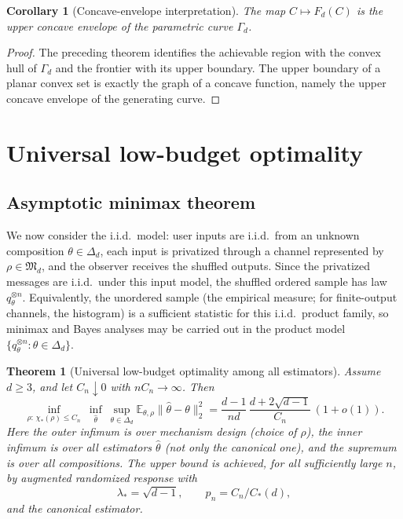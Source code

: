 \documentclass[11pt]{amsart}
\newtheorem{theorem}{Theorem}[section]
\newtheorem{corollary}[corollary]{Corollary}
\theoremstyle{definition}
\newcommand{\E}{\mathbb E}
\newcommand{\fM}{\mathfrak M}
\begin{document}
\begin{corollary}[Concave-envelope interpretation]\label{cor:concave-envelope}
The map $C\mapsto F_d(C)$ is the upper concave envelope of the parametric curve $\Gamma_d$.
\end{corollary}

\begin{proof}
The preceding theorem identifies the achievable region with the convex hull of $\Gamma_d$ and the frontier with its upper boundary. The upper boundary of a planar convex set is exactly the graph of a concave function, namely the upper concave envelope of the generating curve.
\end{proof}

\section{Universal low-budget optimality}\label{sec:asymptotic}

\subsection{Asymptotic minimax theorem}

We now consider the i.i.d.\ model: user inputs are i.i.d.\ from an unknown composition $\theta\in\Delta_d$, each input is privatized through a channel represented by $\rho\in\fM_d$, and the observer receives the shuffled outputs. Since the privatized messages are i.i.d.\ under this input model, the shuffled ordered sample has law $q_\theta^{\otimes n}$. Equivalently, the unordered sample (the empirical measure; for finite-output channels, the histogram) is a sufficient statistic for this i.i.d.\ product family, so minimax and Bayes analyses may be carried out in the product model $\{q_\theta^{\otimes n}:\theta\in\Delta_d\}$.

\begin{theorem}[Universal low-budget optimality among all estimators]\label{thm:main-design}
Assume $d\ge 3$, and let $C_n\downarrow 0$ with $nC_n\to\infty$. Then
\[
\inf_{\rho:\,\chi_*(\rho)\le C_n}\ \inf_{\widehat\theta}\ \sup_{\theta\in\Delta_d}
\E_{\theta,\rho}\|\widehat\theta-\theta\|_2^2
=
\frac{d-1}{nd}\,\frac{d+2\sqrt{d-1}}{C_n}\,(1+o(1)).
\]
Here the outer infimum is over mechanism design (choice of $\rho$), the inner infimum is over \emph{all} estimators $\widehat\theta$ (not only the canonical one), and the supremum is over all compositions.
The upper bound is achieved, for all sufficiently large $n$, by augmented randomized response with
\[
\lambda_*=\sqrt{d-1},\qquad p_n=C_n/C_*(d),
\]
and the canonical estimator.
\end{theorem}
\end{document}
